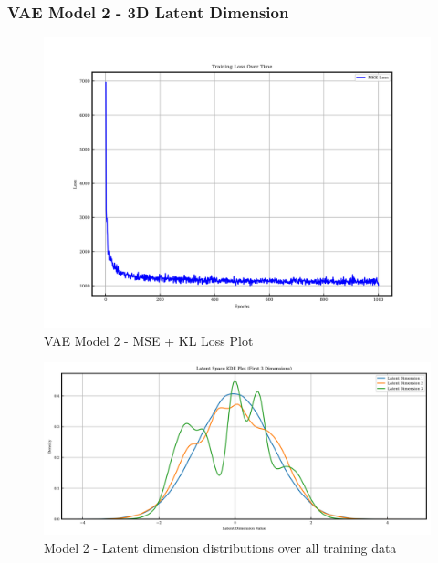 \documentclass{article}
\begin{document}
\subsubsection{VAE Model 2 - 3D Latent Dimension}

\begin{figure}[H]
\centering
    \includegraphics[width=0.75\linewidth]{figures/VAEmodels/model2/loss_plot.png}
    \caption{VAE Model 2 - MSE + KL Loss Plot}
    \label{fig:model2_loss_plot}
\end{figure}

\begin{figure}[H]
    \centering
    \includegraphics[width=0.75\linewidth]{figures/VAEmodels/model2/latent_distribution.png}
    \caption{Model 2 - Latent dimension distributions over all training data}
    \label{fig:model2_latent_dist}
\end{figure}
\end{document}
